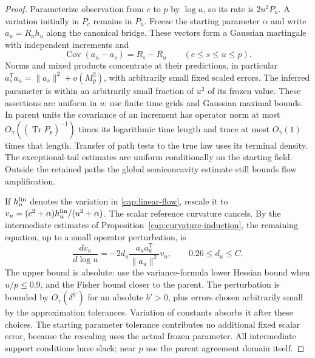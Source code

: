 \begin{proof}
Parameterize observation from $c$ to $p$ by $\log u$, so its rate
is $2u^2P_u$.  A variation initially in $P_c$ remains in $P_u$.
Freeze the starting parameter $\alpha$ and write
$a_u=R_uh_u$ along the canonical bridge.  These vectors form a
Gaussian martingale with independent increments and
\[
 \operatorname{Cov}(a_u-a_s)=R_s-R_u\qquad(c\le s\le u\le p).
\]
Norms and mixed products concentrate at their predictions, in particular
$a_s^{\mathsf T}a_u=\|a_s\|^2+o(M_p^2)$, with arbitrarily small fixed scaled
errors. The inferred parameter is within an arbitrarily small fraction of
$u^2$ of its frozen value. These assertions are uniform in $u$: use finite
time grids and Gaussian maximal bounds. In parent units the covariance of an
increment has operator norm at most $O_\gamma((\operatorname{Tr}P_p)^{-1})$
times its logarithmic time length and trace at most $O_\gamma(1)$ times that
length. Transfer of path tests to the true law uses its terminal density. The
exceptional-tail estimates are uniform conditionally on the starting field.
Outside the retained paths the global semiconcavity estimate still bounds flow
amplification.

If $h_u^{\rm lin}$ denotes the variation in \eqref{cap:linear-flow}, rescale
it to $v_u=(c^2+\alpha)h_u^{\rm lin}/(u^2+\alpha)$. The scalar reference
curvature cancels. By the intermediate estimates of
Proposition~\ref{cap:curvature-induction}, the remaining equation, up to a
small operator perturbation, is
\begin{equation}\label{cap:rank-flow}
 \frac{dv_u}{d\log u}
       =-2d_u\frac{a_ua_u^{\mathsf T}}{\|a_u\|^2}v_u,
       \qquad 0.26\le d_u\le C.
\end{equation}
The upper bound is absolute: use the variance-formula lower Hessian bound when
$u/p\le0.9$, and the Fisher bound closer to the parent. The perturbation is
bounded by $O_\gamma(\delta^{b'})$ for an absolute $b'>0$, plus errors chosen
arbitrarily small by the approximation tolerances. Variation of constants
absorbs it after these choices. The starting parameter tolerance contributes
no additional fixed scalar error, because the rescaling uses the actual frozen
parameter. All intermediate support conditions have slack; near $p$ use the
parent agreement domain itself.


\end{proof}
